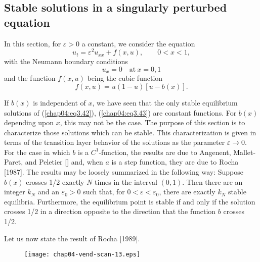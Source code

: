 \documentclass{surv-l}
\theoremstyle{plain}
\theoremstyle{definition}
\numberwithin{equation}{section}
\numberwithin{figure}{chapter}
\begin{document}
\subsection{Stable solutions in a singularly perturbed equation}\label{subsec4.3.8} In this section, for $\varepsilon >0$ a constant, we consider the equation 
\begin{equation}\label{chap04:eq3.42}
u_{t}=\varepsilon^{2}u_{xx}+f(x, u), \qquad 0<x<1,
\end{equation}
with the Neumann boundary conditions
\begin{equation}\label{chap04:eq3.43}
u_{x}=0 \quad \mathrm{at}\ x=0,1
\end{equation}
and the function $f(x, u)$ being the cubic function
\begin{equation}\label{chap04:eq3.44}
f(x, u)=u(1-u)[u-b(x)].
\end{equation}

If $b(x)$ is independent of $x$, we have seen that the only stable equilibrium solutions of (\ref{chap04:eq3.42}), (\ref{chap04:eq3.43}) are constant functions. For $b(x)$ depending upon $x$, this may not be the case. The purpose of this section is to characterize those solutions which can be stable. This characterization is given in terms of the transition layer behavior of the solutions as the parameter $\varepsilon \rightarrow 0$. For the case in which $b$ is a $C^{1}$-function, the results are due to Angenent, Mallet-Paret, and Peletier [\citeyear{1987amp}] and, when $a$ is a step function, they are due to Rocha [1987]. The results may be loosely summarized in the following way: Suppose $b(x)$ crosses 1/2 exactly $N$ times in the interval $(0,1)$. Then there are an integer $k_{N}$ and an $\varepsilon _{0}>0$ such that, for $0<\varepsilon <\varepsilon _{0}$, there are exactly $k_{N}$ stable equilibria. Furthermore, the equilibrium point is stable if and only if the solution crosses 1/2 in a direction opposite to the direction that the function $b$ crosses 1/2.

Let us now state the result of Rocha [1989].
\begin{figure}
\texttt{[image: chap04-vend-scan-13.eps]}
\caption{}
\label{fig3.11}
\end{figure}
\end{document}
